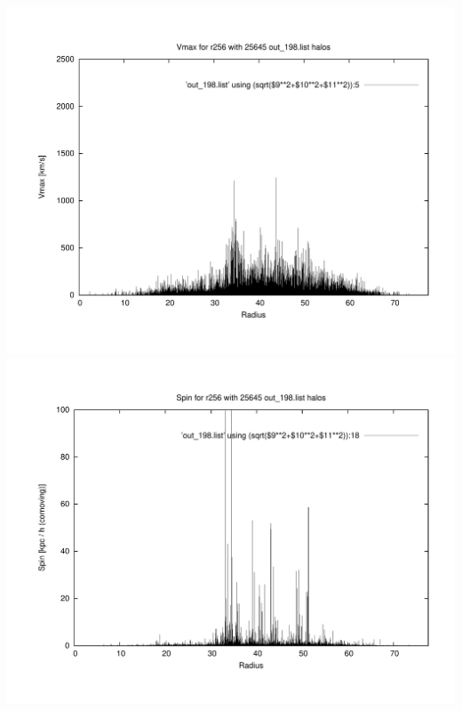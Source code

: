 \includegraphics[scale=0.3]{r256/stages_52/plot_Vmax_out_198.pdf}
\includegraphics[scale=0.3]{r256/stages_52/plot_spin_out_198.pdf}



